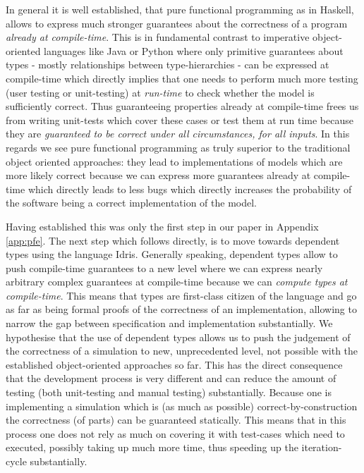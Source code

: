 In general it is well established, that pure functional programming as in Haskell, allows to express much stronger guarantees about the correctness of a program \textit{already at compile-time}. This is in fundamental contrast to imperative object-oriented languages like Java or Python where only primitive guarantees about types - mostly relationships between type-hierarchies - can be expressed at compile-time which directly implies that one needs to perform much more testing (user testing or unit-testing) at \textit{run-time} to check whether the model is sufficiently correct. Thus guaranteeing properties already at compile-time frees us from writing unit-tests which cover these cases or test them at run time because they are \textit{guaranteed to be correct under all circumstances, for all inputs}. In this regards we see pure functional programming as truly superior to the traditional object oriented approaches: they lead to implementations of models which are more likely correct because we can express more guarantees already at compile-time which directly leads to less bugs which directly increases the probability of the software being a correct implementation of the model.

Having established this was only the first step in our paper in Appendix \ref{app:pfe}. The next step which follows directly, is to move towards dependent types using the language Idris. Generally speaking, dependent types allow to push compile-time guarantees to a new level where we can express nearly arbitrary complex guarantees at compile-time because we can \textit{compute types at compile-time}. This means that types are first-class citizen of the language and go as far as being formal proofs of the correctness of an implementation, allowing to narrow the gap between specification and implementation substantially. We hypothesise that the use of dependent types allows us to push the judgement of the correctness of a simulation to new, unprecedented level, not possible with the established object-oriented approaches so far. This has the direct consequence that the development process is very different and can reduce the amount of testing (both unit-testing and manual testing) substantially. Because one is implementing a simulation which is (as much as possible) correct-by-construction the correctness (of parts) can be guaranteed statically. This means that in this process one does not rely as much on covering it with test-cases which need to executed, possibly taking up much more time, thus speeding up the iteration-cycle substantially.

